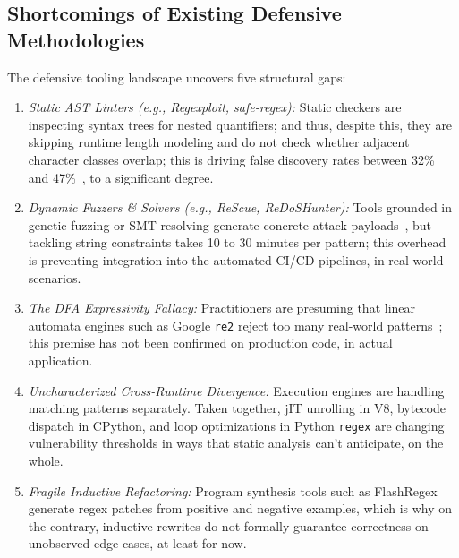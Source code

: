\documentclass{ieeeaccess}
\begin{document}
\subsection{Shortcomings of Existing Defensive Methodologies}
The defensive tooling landscape uncovers five structural gaps:
\begin{enumerate}
    \item \emph{Static AST Linters (e.g., Regexploit, safe-regex):} Static checkers are inspecting syntax trees for nested quantifiers; and thus, despite this, they are skipping runtime length modeling and do not check whether adjacent character classes overlap; this is driving false discovery rates between 32\% and 47\%~\cite{davis2019why,regexploit2021,safe_regex2023}, to a significant degree.
    \item \emph{Dynamic Fuzzers \& Solvers (e.g., ReScue, ReDoSHunter):} Tools grounded in genetic fuzzing or SMT resolving generate concrete attack payloads~\cite{shen2018rescue,li2021redoshunter}, but tackling string constraints takes 10 to 30 minutes per pattern; this overhead is preventing integration into the automated CI/CD pipelines, in real-world scenarios.
    \item \emph{The DFA Expressivity Fallacy:} Practitioners are presuming that linear automata engines such as Google \texttt{re2} reject too many real-world patterns~\cite{cox2007regular,chapman2016exploring}; this premise has not been confirmed on production code, in actual application.
    \item \emph{Uncharacterized Cross-Runtime Divergence:} Execution engines are handling matching patterns separately. Taken together, jIT unrolling in V8, bytecode dispatch in CPython, and loop optimizations in Python \texttt{regex} are changing vulnerability thresholds in ways that static analysis can't anticipate, on the whole.
    \item \emph{Fragile Inductive Refactoring:} Program synthesis tools such as FlashRegex~\cite{li2020flashregex} generate regex patches from positive and negative examples, which is why on the contrary, inductive rewrites do not formally guarantee correctness on unobserved edge cases, at least for now.
\end{enumerate}
\end{document}
